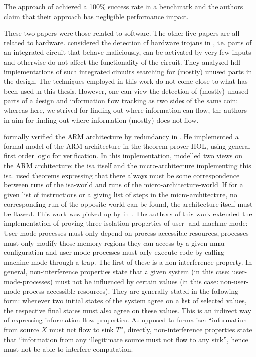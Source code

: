 The approach of \cite{SuhLZD04} achieved a 100\% success rate in a benchmark and the authors claim that their approach has negligible performance impact.

These two papers were those related to software.
The other five papers are all related to hardware.
\citeauthor{Zhang15} considered the detection of hardware trojans in  \cite{Zhang15}, i.e. parts of an integrated circuit that behave maliciously, can be activated by very few inputs and otherwise do not affect the functionality of the circuit.
They analyzed \gls{hdl} implementations of such integrated circuits searching for (mostly) unused parts in the design.
The techniques employed in this work do not come close to what has been used in this thesis.
However, one can view the detection of (mostly) unused parts of a design and information flow tracking as two sides of the same coin: whereas here, we strived for finding out where information can flow, the authors in \cite{Zhang15} aim for finding out where information (mostly) does not flow.

\citeauthor{Fox02} formally verified the ARM architecture by redundancy in  \cite{Fox02}.
He implemented a formal model of the ARM architecture in the theorem prover HOL, using general first order logic for verification.
In this implementation, \citeauthor{Fox02} modelled two views on the ARM architecture: the \gls{isa} itself and the micro-architecture implementing this \gls{isa}.
\citeauthor{Fox02} used theorems expressing that there always must be some correspondence between runs of the \gls{isa}-world and runs of the micro-architecture-world.
If for a given list of instructions or a giving list of steps in the micro-architecture, no corresponding run of the opposite world can be found, the architecture itself must be flawed.
This work was picked up by \citeauthor{KhakpourSD13} in  \cite{KhakpourSD13}.
The authors of this work extended the implementation of \citeauthor{Fox02} proving three isolation properties of user- and machine-mode:
User-mode processes must only depend on process-accessible-resources, processes must only modify those memory regions they can access by a given \gls{mmu} configuration and user-mode-processes must only execute code by calling machine-mode through a trap.
The first of these is a non-interference property.
In general, non-interference properties state that a given system (in this case: user-mode-processes) must not be influenced by certain values (in this case: non-user-mode-process accessible resources).
They are generally stated in the following form: whenever two initial states of the system agree on a list of selected values, the respective final states must also agree on these values.
This is an indirect way of expressing information flow properties.
As opposed to formalize: \enquote{information from source $ X $ must not flow to sink $ T $}, directly, non-interference properties state that \enquote{information from any illegitimate source must not flow to any sink}, hence must not be able to interfere computation.

